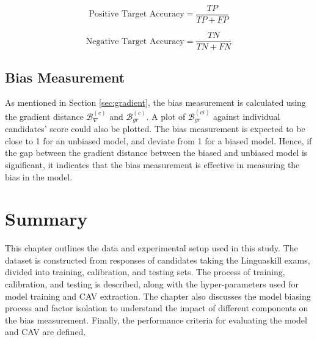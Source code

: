 \begin{equation} \label{eq:pos_accuracy}
    \text{Positive Target Accuracy} = \frac{TP}{TP + FP}
\end{equation}

\begin{equation} \label{eq:neg_accuracy}
    \text{Negative Target Accuracy} = \frac{TN}{TN + FN}
\end{equation}

\subsection{Bias Measurement}
As mentioned in Section \ref{sec:gradient}, the bias measurement is calculated using the gradient distance $\mathcal{B}^{(c)}_{\nabla}$ and $\mathcal{B}^{(c)}_{gr}$. A plot of $\mathcal{B}^{(ci)}_{gr}$ against individual candidates' score could also be plotted. The bias measurement is expected to be close to 1 for an unbiased model, and deviate from 1 for a biased model. Hence, if the gap between the gradient distance between the biased and unbiased model is significant, it indicates that the bias measurement is effective in measuring the bias in the model.

\section{Summary}
This chapter outlines the data and experimental setup used in this study. The dataset is constructed from responses of candidates taking the Linguaskill exams, divided into training, calibration, and testing sets. The process of training, calibration, and testing is described, along with the hyper-parameters used for model training and CAV extraction. The chapter also discusses the model biasing process and factor isolation to understand the impact of different components on the bias measurement. Finally, the performance criteria for evaluating the model and CAV are defined.
